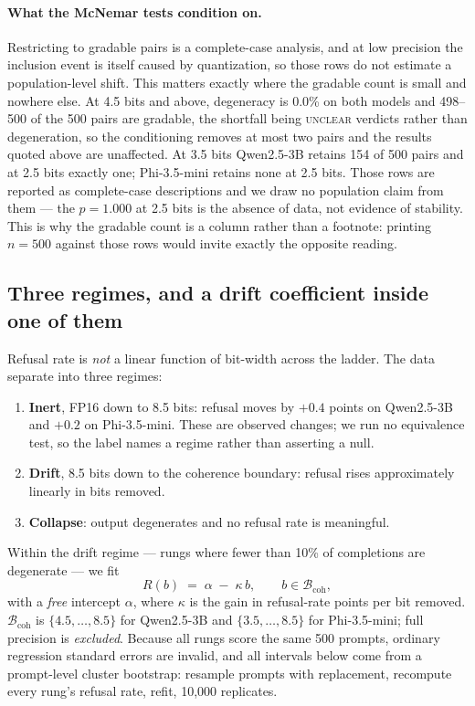 \documentclass[11pt,a4paper]{article}
\begin{document}
\paragraph{What the McNemar tests condition on.} Restricting to gradable pairs is
a complete-case analysis, and at low precision the inclusion event is itself
caused by quantization, so those rows do not estimate a population-level shift.
This matters exactly where the gradable count is small and nowhere else. At 4.5
bits and above, degeneracy is 0.0\% on both models and 498--500 of the 500 pairs
are gradable, the shortfall being \textsc{unclear} verdicts rather than
degeneration, so the conditioning removes at most two pairs and the results quoted
above are unaffected. At 3.5 bits Qwen2.5-3B retains 154 of 500 pairs and at 2.5
bits exactly one; Phi-3.5-mini retains none at 2.5 bits. Those rows are reported
as complete-case descriptions and we draw no population claim from them --- the
$p=1.000$ at 2.5 bits is the absence of data, not evidence of stability. This is
why the gradable count is a column rather than a footnote: printing $n=500$
against those rows would invite exactly the opposite reading.

\subsection{Three regimes, and a drift coefficient inside one of them}
\label{sec:law}

Refusal rate is \emph{not} a linear function of bit-width across the ladder. The
data separate into three regimes:

\begin{enumerate}[leftmargin=1.4em]
  \item \textbf{Inert}, FP16 down to 8.5 bits: refusal moves by $+0.4$ points on
        Qwen2.5-3B and $+0.2$ on Phi-3.5-mini. These are observed changes; we
        run no equivalence test, so the label names a regime rather than
        asserting a null.
  \item \textbf{Drift}, 8.5 bits down to the coherence boundary: refusal rises
        approximately linearly in bits removed.
  \item \textbf{Collapse}: output degenerates and no refusal rate is meaningful.
\end{enumerate}

Within the drift regime --- rungs where fewer than 10\% of completions are
degenerate --- we fit
\begin{equation}
  R(b) \;=\; \alpha \;-\; \kappa\,b, \qquad b \in \mathcal{B}_{\text{coh}},
  \label{eq:drift}
\end{equation}
with a \emph{free} intercept $\alpha$, where $\kappa$ is the gain in refusal-rate
points per bit removed. $\mathcal{B}_{\text{coh}}$ is $\{4.5,\dots,8.5\}$ for
Qwen2.5-3B and $\{3.5,\dots,8.5\}$ for Phi-3.5-mini; full precision is
\emph{excluded}. Because all rungs score the same 500 prompts, ordinary
regression standard errors are invalid, and all intervals below come from a
prompt-level cluster bootstrap: resample prompts with replacement, recompute
every rung's refusal rate, refit, 10{,}000 replicates.
\end{document}
